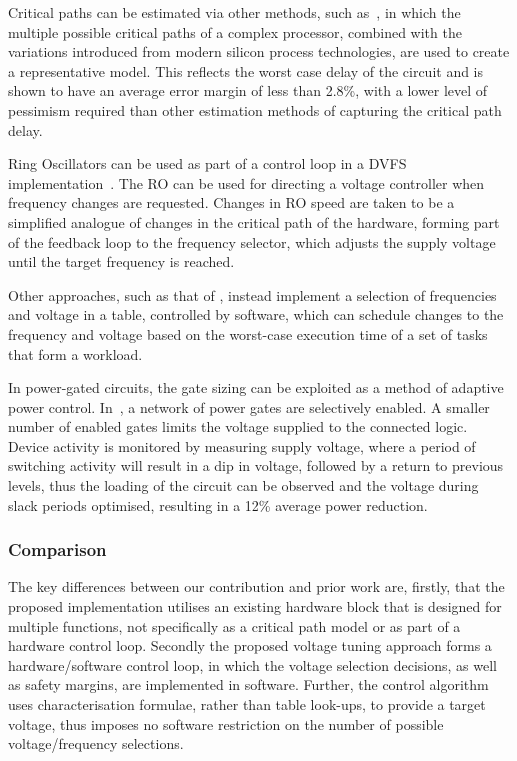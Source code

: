 \documentclass[a4paper,twocolumn,DIV=16]{scrartcl}
\begin{document}
Critical paths can be estimated via other methods, such as~\cite{Liu2010}, in
which the multiple possible critical paths of a complex processor, combined with
the variations introduced from modern silicon process technologies, are used to
create a representative model. This reflects the worst case delay of the circuit
and is shown to have an average error margin of less than 2.8\%, with a lower
level of pessimism required than other estimation methods of capturing the
critical path delay. 

Ring Oscillators can be used as part of a control loop in a DVFS
implementation~\cite{burd2000scaled}. The RO can be used for directing a voltage
controller when frequency changes are requested. Changes in RO speed are taken
to be a simplified analogue of changes in the critical path of the hardware,
forming part of the feedback loop to the frequency selector, which adjusts the
supply voltage until the target frequency is reached.

Other approaches, such as that of \cite{lee2000hopping}, instead implement a
selection of frequencies and voltage in a table, controlled by software, which
can schedule changes to the frequency and voltage based on the worst-case
execution time of a set of tasks that form a workload.

In power-gated circuits, the gate sizing can be exploited as a method of
adaptive power control. In~\cite{Hsieh2011}, a network of power gates are
selectively enabled. A smaller number of enabled gates limits the voltage
supplied to the connected logic. Device activity is monitored by measuring
supply voltage, where a period of switching activity will result in a dip in
voltage, followed by a return to previous levels, thus the loading of the
circuit can be observed and the voltage during slack periods optimised,
resulting in a 12\% average power reduction.

\subsubsection*{Comparison}

The key differences between our contribution and prior work are, firstly, that
the proposed implementation utilises an existing hardware block that is designed
for multiple functions, not specifically as a critical path model or as part of
a hardware control loop. Secondly the proposed voltage tuning approach forms a
hardware/software control loop, in which the voltage selection decisions, as
well as safety margins, are implemented in software. Further, the control
algorithm uses characterisation formulae, rather than table look-ups, to provide
a target voltage, thus imposes no software restriction on the number of possible
voltage/frequency selections.
\end{document}
